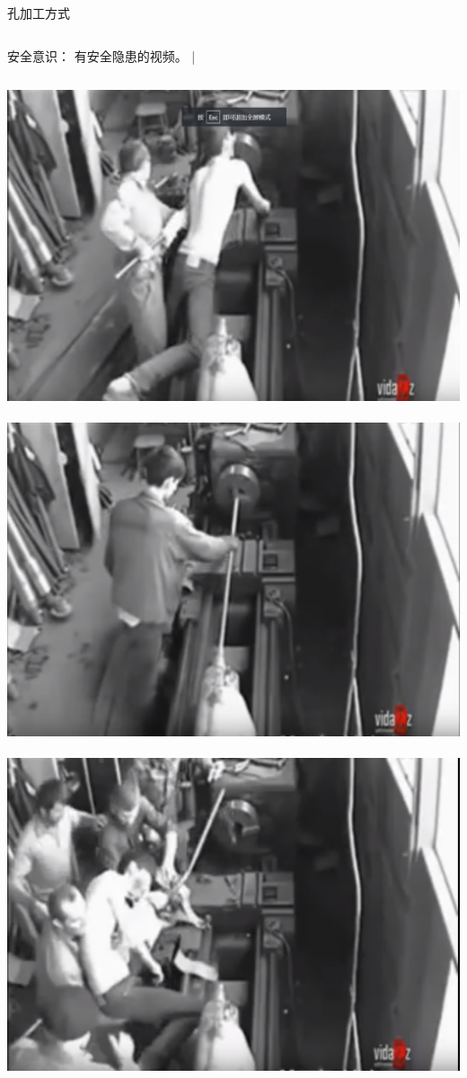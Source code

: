 \documentclass[utf8,zihao=-4,handout,smaller,aspectratio=1610]{ctexbeamer}
\begin{document}
\begin{frame}{孔加工方式}
	\begin{columns}
		\begin{block}{安全意识：}
			有安全隐患的视频。
			|\end{block}
	\end{columns}
	
	\vspace{25pt}
	
	\includegraphics[width=.3\linewidth,trim=0 0 0  0,clip,angle=0]{image/anquan5.png}~
	\includegraphics[width=0.3\linewidth,trim=0 0 0 0,clip,angle=0]{image/anquan6.png}~
	\includegraphics[width=0.3\linewidth,trim=0 0 0 0,clip,angle=0]{image/anquan7.png}	
\end{frame}
\end{document}
